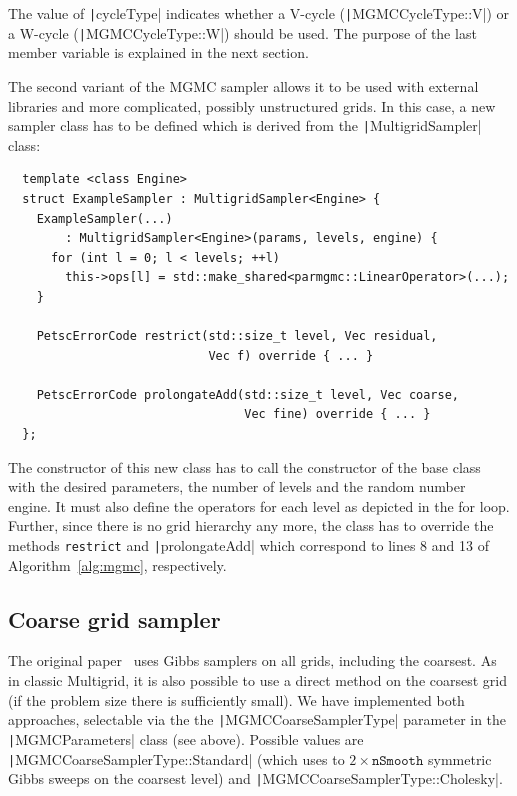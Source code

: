 \documentclass[
fontsize=11pt,
paper=a4,
numbers=noenddot
]{scrartcl}
\begin{document}
The value of \texttt|cycleType| indicates whether a V-cycle (\texttt|MGMCCycleType::V|) or a W-cycle (\texttt|MGMCCycleType::W|) should be used. The purpose of the last member variable is explained in the next section. 

The second variant of the MGMC sampler allows it to be used with external libraries and more complicated, possibly unstructured grids. In this case, a new sampler class has to be defined which is derived from the \texttt|MultigridSampler| class:
\begin{verbatim}
  template <class Engine> 
  struct ExampleSampler : MultigridSampler<Engine> {
    ExampleSampler(...)
        : MultigridSampler<Engine>(params, levels, engine) {
      for (int l = 0; l < levels; ++l)
        this->ops[l] = std::make_shared<parmgmc::LinearOperator>(...);
    }

    PetscErrorCode restrict(std::size_t level, Vec residual, 
                            Vec f) override { ... }

    PetscErrorCode prolongateAdd(std::size_t level, Vec coarse,
                                 Vec fine) override { ... }
  };    
\end{verbatim}
The constructor of this new class has to call the constructor of the base class with the desired parameters, the number of levels and the random number engine. It must also define the operators for each level as depicted in the for loop. Further, since there is no grid hierarchy any more, the class has to override the methods \texttt{restrict} and \texttt|prolongateAdd| which correspond to lines 8 and 13 of Algorithm~\ref{alg:mgmc}, respectively.

\subsection{Coarse grid sampler}
The original paper~\cite{goodmansokal} uses Gibbs samplers on all grids, including the coarsest. As in classic Multigrid, it is also possible to use a direct method on the coarsest grid (if the problem size there is sufficiently small). We have implemented both approaches, selectable via the the \texttt|MGMCCoarseSamplerType| parameter in the \texttt|MGMCParameters| class (see above). Possible values are \texttt|MGMCCoarseSamplerType::Standard| (which uses to $2 \times \texttt{nSmooth}$ symmetric Gibbs sweeps on the coarsest level) and \texttt|MGMCCoarseSamplerType::Cholesky|.
\end{document}
